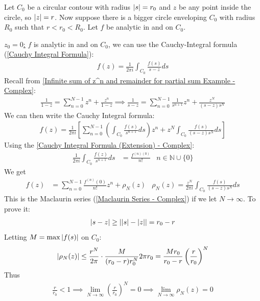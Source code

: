 \documentclass[12pt, english]{book}
\makeatletter
\renewenvironment{proof}[1][\proofname]{\par
	\pushQED{\qed}%
	\normalfont \topsep6\p@\@plus6\p@\relax
	\list{}{%
		\settowidth{\leftmargin}{\itshape\proofname:\hskip\labelsep}%
		\setlength{\labelwidth}{0pt}%
		\setlength{\itemindent}{-\leftmargin}%
	}%
	\item[\hskip\labelsep\itshape#1\@addpunct{:}]\ignorespaces
	}{ \popQED\endlist\@endpefalse}
\makeatother
\begin{document}
	\begin{proof}
		Let \(C_0\) be a circular contour with radius \(\abs{s} = r_0\) and \(z\) be any point inside the circle, so \(\abs{z} = r\). Now suppose there is a bigger circle enveloping \(C_0\) with radius \(R_0\) such that \(r < r_0 < R_0\). Let \(f\) be analytic in and on \(C_0\).
		
		\underline{\(z_0 = 0\):} \newline
		\(f\) is analytic in and on \(C_0\), we can use the Cauchy-Integral formula (\cref{Cauchy Integral Formula}):
		\begin{align*}
			f(z) = \frac{1}{2\pi i} \int_{C_0} \frac{f(s)}{s-z} ds
		\end{align*}
		Recall from \cref{Infinite sum of z^n and remainder for partial sum Example - Complex}:
		\begin{align*}
			\frac{1}{1-z} = \sum_{n=0}^{N-1} z^n + \frac{z^n}{1-z}
			\implies \frac{1}{s-z} = \sum_{n=0}^{N-1} \frac{1}{s^{n+1}} z^n + \frac{z^N}{(s-z)s^N}
		\end{align*}
		We can then write the Cauchy Integral formula:
		\begin{align*}
			f(z) = \frac{1}{2\pi i} \left[
			\sum_{n=0}^{N-1} \left(\int_{C_0} \frac{f(s)}{s^{n+1}} ds \right) z^n + z^N \int_{C_0} \frac{f(s)}{(s-z)s^N} ds
			\right]
		\end{align*}
		Using the \cref{Cauchy Integral Formula (Extension) - Complex}:
		\begin{align*}
			\frac{1}{2\pi i} \int_{C_0} \frac{f(z)}{s^{n+1}} ds &= \frac{f^{(n)(0)}}{n!}
			& n \in \mathbb{N} \cup \{0\}
		\end{align*}
		We get 
		\begin{align*}
			f(z) &= \sum_{n=0}^{N-1} \frac{f^{(n)}(0)}{n!} z^n + \rho_N (z) &
			\rho_N(z) = \frac{z^N}{2\pi i} \int_{C_0} \frac{f(s)}{(s-z)s^N} ds
		\end{align*}
		This is the Maclaurin series (\cref{Maclaurin Series - Complex}) if we let \(N \rightarrow \infty\). To prove it: 
		\begin{align*}
			\abs{s-z} \geq \abs{\abs{s} - \abs{z}} = r_0 - r
		\end{align*}
		Letting \(M = \max\abs{f(s)}\) on \(C_0\):
		\begin{align*}
			\abs{\rho_N(z)} \leq \frac{r^N}{2\pi} \cdot \frac{M}{(r_0 - r)r_0^N} 2\pi r_0 = \frac{Mr_0}{r_0 - r} \left(\frac{r}{r_0}\right)^N
		\end{align*}
		Thus
		\begin{align*}
			\frac{r}{r_0} < 1 
			\implies \lim_{N\rightarrow \infty} \left(\frac{r}{r_0}\right)^N = 0 
			\implies \lim_{N \rightarrow \infty} \rho_N (z) = 0
		\end{align*}
		

\end{proof}
\end{document}
